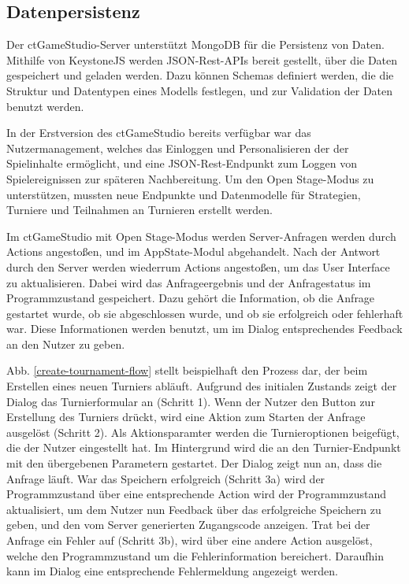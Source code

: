 \subsection{Datenpersistenz}

Der ctGameStudio-Server unterstützt MongoDB für die Persistenz von Daten. Mithilfe von KeystoneJS
werden JSON-Rest-APIs bereit gestellt, über die Daten gespeichert und geladen werden. Dazu können
Schemas definiert werden, die die Struktur und Datentypen eines Modells festlegen, und zur
Validation der Daten benutzt werden.

In der Erstversion des ctGameStudio bereits verfügbar war das Nutzermanagement, welches das Einloggen und
Personalisieren der der Spielinhalte ermöglicht, und eine JSON-Rest-Endpunkt zum Loggen von
Spielereignissen zur späteren Nachbereitung. Um den Open Stage-Modus zu unterstützen, mussten neue
Endpunkte und Datenmodelle für Strategien, Turniere und Teilnahmen an Turnieren erstellt werden.

Im ctGameStudio mit Open Stage-Modus werden Server-Anfragen werden durch Actions angestoßen, und im
AppState-Modul abgehandelt. Nach der Antwort durch den Server werden wiederrum Actions angestoßen,
um das User Interface zu aktualisieren. Dabei wird das Anfrageergebnis und der Anfragestatus im
Programmzustand gespeichert. Dazu gehört die Information, ob die Anfrage gestartet wurde, ob sie
abgeschlossen wurde, und ob sie erfolgreich oder fehlerhaft war. Diese Informationen werden benutzt,
um im Dialog entsprechendes Feedback an den Nutzer zu geben.

Abb. \ref{create-tournament-flow} stellt beispielhaft den Prozess dar, der beim Erstellen eines
neuen Turniers abläuft. Aufgrund des initialen Zustands zeigt der Dialog das Turnierformular an
(Schritt 1). Wenn der Nutzer den Button zur Erstellung des Turniers drückt, wird eine Aktion zum
Starten der Anfrage ausgelöst (Schritt 2). Als Aktionsparamter werden die Turnieroptionen beigefügt,
die der Nutzer eingestellt hat. Im Hintergrund wird die an den Turnier-Endpunkt mit den übergebenen
Parametern gestartet. Der Dialog zeigt nun an, dass die Anfrage läuft. War das Speichern erfolgreich
(Schritt 3a) wird der Programmzustand über eine entsprechende
Action wird der Programmzustand aktualisiert, um dem Nutzer nun Feedback über das erfolgreiche
Speichern zu geben, und den vom Server generierten Zugangscode anzeigen. Trat bei der Anfrage ein
Fehler auf (Schritt 3b), wird über eine andere Action ausgelöst, welche den Programmzustand um die
Fehlerinformation bereichert. Daraufhin kann im Dialog eine entsprechende Fehlermeldung angezeigt
werden.
 
